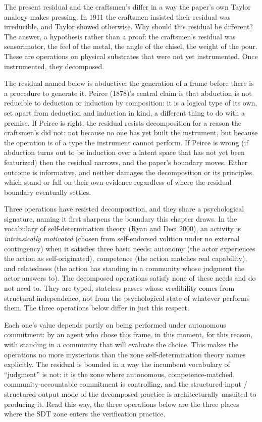 \documentclass[
  11pt,
]{article}
\begin{document}
The present residual and the craftsmen's differ in a way the paper's own
Taylor analogy makes pressing. In 1911 the craftsmen insisted their
residual was irreducible, and Taylor showed otherwise. Why should this
residual be different? The answer, a hypothesis rather than a proof: the
craftsmen's residual was sensorimotor, the feel of the metal, the
angle of the chisel, the weight of the pour. These are operations on
physical substrates that were not yet instrumented. Once instrumented,
they decomposed.

The residual named below is abductive: the generation of a frame before
there is a procedure to generate it. Peirce (1878)'s central claim is that
abduction is not reducible to deduction or induction by composition: it is
a logical type of its own, set apart from deduction and induction in kind,
a different thing to do with a premise. If Peirce is right, the residual
resists decomposition for a reason the craftsmen's did not: not because no
one has yet built the instrument, but because the operation is of a type
the instrument cannot perform. If Peirce is wrong (if abduction turns out
to be induction over a latent space that has not yet been featurized) then
the residual narrows, and the paper's boundary moves. Either outcome is
informative, and neither damages the decomposition or its principles,
which stand or fall on their own evidence regardless of where the residual
boundary eventually settles.

Three operations have resisted decomposition, and they share a
psychological signature, naming it first sharpens the boundary this
chapter draws. In the vocabulary of self-determination theory (Ryan and
Deci 2000), an activity is \emph{intrinsically motivated} (chosen from
self-endorsed volition under no external contingency) when it satisfies
three basic needs: autonomy (the actor experiences the action as
self-originated), competence (the action matches real capability), and
relatedness (the action has standing in a community whose judgment the
actor answers to). The decomposed operations satisfy none of these needs
and do not need to. They are typed, stateless passes whose credibility
comes from structural independence, not from the psychological state of
whatever performs them. The three operations below differ in just this
respect.

Each one's value depends partly on being performed under autonomous
commitment: by an agent who chose this frame, in this moment, for this
reason, with standing in a community that will evaluate the choice. This
makes the operations no more mysterious than the zone self-determination
theory names explicitly. The residual is bounded in a way the incumbent
vocabulary of ``judgment'' is not: it is the zone where autonomous,
competence-matched, community-accountable commitment is controlling, and
the structured-input / structured-output mode of the decomposed practice
is architecturally unsuited to producing it. Read this way, the three
operations below are the three places where the SDT zone enters the
verification practice.
\end{document}
